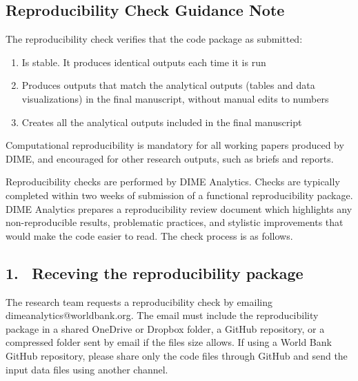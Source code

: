 


	\begin{fullwidth}


	\section*{Reproducibility Check Guidance Note}

The reproducibility check verifies that the code package as submitted:

	\begin{enumerate}
		\setlength\itemsep{-0.1em}
		\item Is stable. It produces identical outputs each time it is run
		\item Produces outputs that match the analytical outputs (tables and data visualizations) in the final manuscript, without manual edits to numbers
		\item Creates all the analytical outputs included in the final manuscript
	\end{enumerate}

Computational reproducibility is mandatory for all working papers produced by DIME, and encouraged for other research outputs, such as briefs and reports. 

Reproducibility checks are performed by DIME Analytics. Checks are typically completed within two weeks of submission of a functional reproducibility package. DIME Analytics prepares a reproducibility review document which highlights any non-reproducible results, problematic practices, and stylistic improvements that would make the code easier to read. The check process is as follows.

	\subsection{1. \, Receving the reproducibility package}

	The research team requests a reproducibility check by emailing dimeanalytics@worldbank.org. The email must include the reproducibility package in a shared OneDrive or Dropbox folder, a GitHub repository, or a compressed folder sent by email if the files size allows. If using a World Bank GitHub repository, please share only the code files through GitHub and send the input data files using another channel. 
	

\end{fullwidth}
